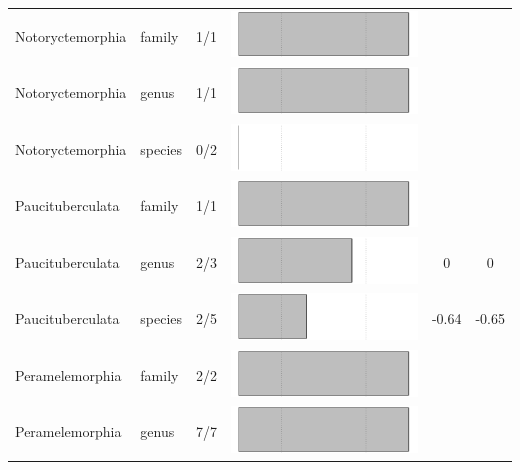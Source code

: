 \begin{longtable}{lL{1.8cm}C{2cm}lcc}
  Notoryctemorphia & family & 1/1 & \includegraphics[width=0.20\linewidth, height=0.05\linewidth]{Missing_mammals/Table_figures/bar46.pdf} &   &   \\ 
  Notoryctemorphia & genus & 1/1 & \includegraphics[width=0.20\linewidth, height=0.05\linewidth]{Missing_mammals/Table_figures/bar47.pdf} &   &   \\ 
  Notoryctemorphia & species & 0/2 & \includegraphics[width=0.20\linewidth, height=0.05\linewidth]{Missing_mammals/Table_figures/bar48.pdf} &   &   \\ 
  Paucituberculata & family & 1/1 & \includegraphics[width=0.20\linewidth, height=0.05\linewidth]{Missing_mammals/Table_figures/bar49.pdf} &   &   \\ 
  Paucituberculata & genus & 2/3 & \includegraphics[width=0.20\linewidth, height=0.05\linewidth]{Missing_mammals/Table_figures/bar50.pdf} & 0 & 0 \\ 
  Paucituberculata & species & 2/5 & \includegraphics[width=0.20\linewidth, height=0.05\linewidth]{Missing_mammals/Table_figures/bar51.pdf} & -0.64 & -0.65 \\ 
  Peramelemorphia & family & 2/2 & \includegraphics[width=0.20\linewidth, height=0.05\linewidth]{Missing_mammals/Table_figures/bar52.pdf} &   &   \\ 
  Peramelemorphia & genus & 7/7 & \includegraphics[width=0.20\linewidth, height=0.05\linewidth]{Missing_mammals/Table_figures/bar53.pdf} &   &   \\ 

\end{longtable}
